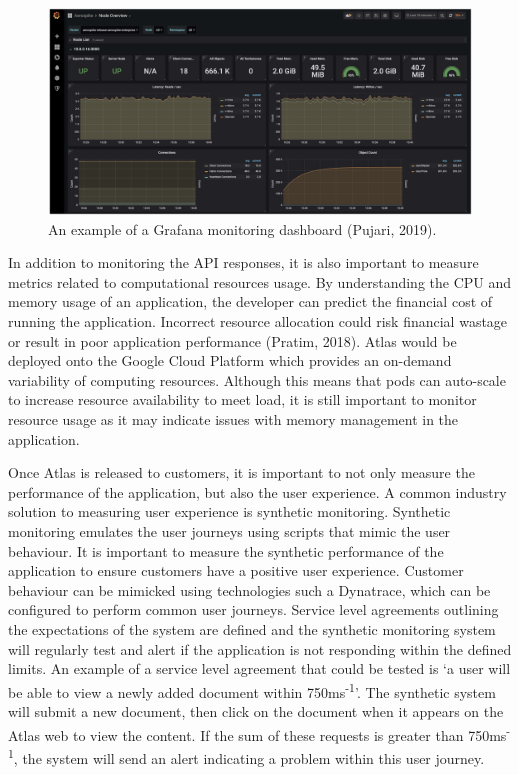 \documentclass{article}
\begin{document}
\begin{figure}[!htb]
  \centering
      \includegraphics[width=1\textwidth]{images/grafana.png}
  \caption{An example of a Grafana monitoring dashboard (Pujari, 2019).}
\end{figure}

In addition to monitoring the API responses, it is also important to measure metrics related to computational resources usage. By understanding the CPU and memory usage of an application, the developer can predict the financial cost of running the application. Incorrect resource allocation could risk financial wastage or result in poor application performance (Pratim, 2018). Atlas would be deployed onto the Google Cloud Platform which provides an on-demand variability of computing resources. Although this means that pods can auto-scale to increase resource availability to meet load, it is still important to monitor resource usage as it may indicate issues with memory management in the application.

Once Atlas is released to customers, it is important to not only measure the performance of the application, but also the user experience. A common industry solution to measuring user experience is synthetic monitoring. Synthetic monitoring emulates the user journeys using scripts that mimic the user behaviour. It is important to measure the synthetic performance of the application to ensure customers have a positive user experience. Customer behaviour can be mimicked using technologies such a Dynatrace, which can be configured to perform common user journeys. Service level agreements outlining the expectations of the system are defined and the synthetic monitoring system will regularly test and alert if the application is not responding within the defined limits. An example of a service level agreement that could be tested is ‘a user will be able to view a newly added document within 750ms\textsuperscript{-1}’. The synthetic system will submit a new document, then click on the document when it appears on the Atlas web to view the content. If the sum of these requests is greater than 750ms\textsuperscript{-1}, the system will send an alert indicating a problem within this user journey.
\end{document}

